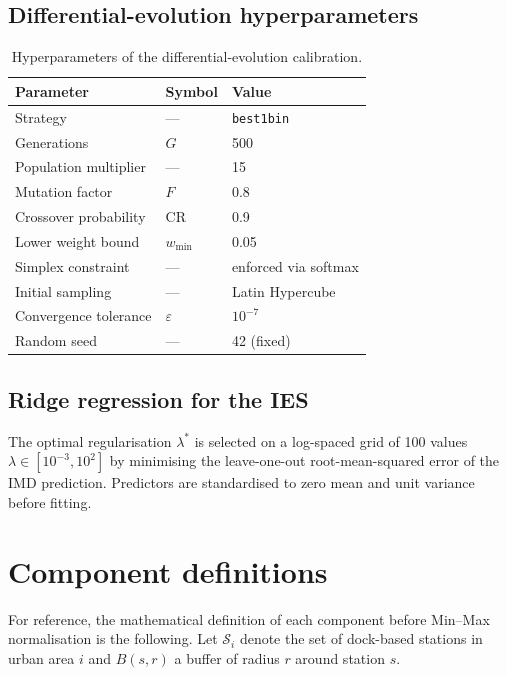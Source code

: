 \documentclass[11pt,a4paper]{article}
\begin{document}
\subsection{Differential-evolution hyperparameters}

\begin{table}[H]
\centering
\caption{Hyperparameters of the differential-evolution calibration.}
\label{tab:de-hyper}
\small
\begin{tabular}{@{}lll@{}}
\toprule
Parameter & Symbol & Value \\
\midrule
Strategy & --- & \texttt{best1bin} \\
Generations & $G$ & 500 \\
Population multiplier & --- & 15 \\
Mutation factor & $F$ & 0.8 \\
Crossover probability & $\mathrm{CR}$ & 0.9 \\
Lower weight bound & $w_{\min}$ & 0.05 \\
Simplex constraint & --- & enforced via softmax \\
Initial sampling & --- & Latin Hypercube \\
Convergence tolerance & $\varepsilon$ & $10^{-7}$ \\
Random seed & --- & 42 (fixed) \\
\bottomrule
\end{tabular}
\end{table}

\subsection{Ridge regression for the IES}

The optimal regularisation $\lambda^{\ast}$ is selected on a
log-spaced grid of 100 values $\lambda \in [10^{-3}, 10^{2}]$ by
minimising the leave-one-out root-mean-squared error of the IMD
prediction. Predictors are standardised to zero mean and unit
variance before fitting.

\section{Component definitions}
\label{app:components}

For reference, the mathematical definition of each component
before Min--Max normalisation is the following. Let
$\mathcal{S}_i$ denote the set of dock-based stations in urban
area $i$ and $B(s, r)$ a buffer of radius $r$ around station $s$.
\end{document}
